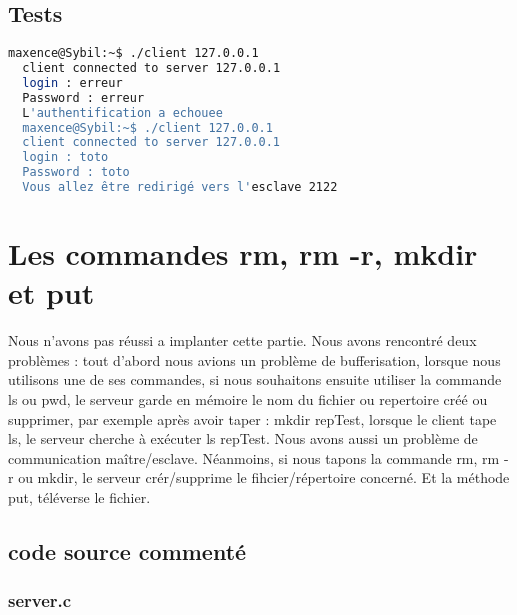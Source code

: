 \documentclass{report}
\begin{document}
      \section{Tests}
  \begin{lstlisting}[frame=single,basicstyle=\footnotesize,language=bash]
  maxence@Sybil:~$ ./client 127.0.0.1
  client connected to server 127.0.0.1
  login : erreur
  Password : erreur
  L'authentification a echouee
  maxence@Sybil:~$ ./client 127.0.0.1
  client connected to server 127.0.0.1
  login : toto
  Password : toto
  Vous allez être redirigé vers l'esclave 2122
  \end{lstlisting}

  \chapter{Les commandes rm, rm -r, mkdir et put}
  Nous n'avons pas r\'eussi a implanter cette partie. Nous avons rencontr\'e deux probl\`emes : tout d'abord nous avions un probl\`eme
  de bufferisation, lorsque nous utilisons une de ses commandes, si nous souhaitons ensuite utiliser la commande ls ou pwd,
  le serveur garde en m\'emoire le nom du fichier ou repertoire cr\'e\'e ou supprimer, par exemple apr\`es avoir taper : mkdir repTest,
  lorsque le client tape ls, le serveur cherche \`a ex\'ecuter ls repTest. Nous avons aussi un probl\`eme de communication ma\^itre/esclave. N\'eanmoins,
  si nous tapons la commande rm, rm -r ou mkdir, le serveur cr\'er/supprime le fihcier/r\'epertoire concern\'e. Et la m\'ethode put, t\'el\'everse le
  fichier.

  \section{code source comment\'e}
  \subsection{server.c}
\end{document}
